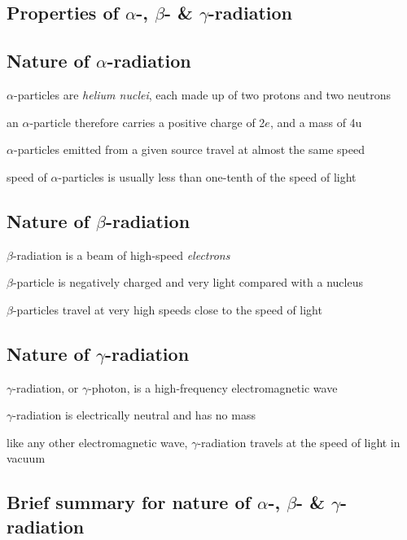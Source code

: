 \subsection{Properties of $\alpha$-, $\beta$- \& $\gamma$-radiation}

\subsection*{Nature of \texorpdfstring{$\alpha$}{\textalpha}-radiation}

$\alpha$-particles are \emph{helium nuclei}, each made up of two protons and two neutrons

an $\alpha$-particle therefore carries a positive charge of 2$e$, and a mass of 4u

$\alpha$-particles emitted from a given source travel at almost the same speed

speed of $\alpha$-particles is usually less than one-tenth of the speed of light

\subsection*{Nature of \texorpdfstring{$\beta$}{\textbeta}-radiation}


$\beta$-radiation is a beam of high-speed \emph{electrons}

$\beta$-particle is negatively charged and very light compared with a nucleus

$\beta$-particles travel at very high speeds close to the speed of light

\subsection*{Nature of \texorpdfstring{$\gamma$}{\textgamma}-radiation}

$\gamma$-radiation, or $\gamma$-photon, is a high-frequency electromagnetic wave

$\gamma$-radiation is electrically neutral and has no mass

like any other electromagnetic wave, $\gamma$-radiation travels at the speed of light in vacuum

\subsection*{Brief summary for nature of \texorpdfstring{$\alpha$}{\textalpha}-, \texorpdfstring{$\beta$}{\textbeta}- \& \texorpdfstring{$\gamma$}{\textgamma}-radiation}



